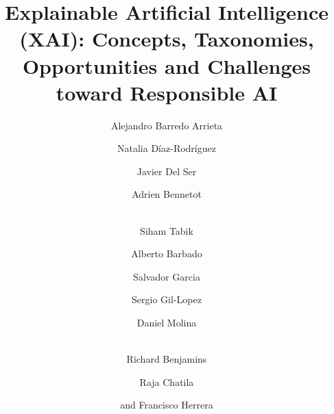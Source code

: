 \documentclass[final]{elsarticle}
\begin{document}
\begin{frontmatter}
	
\title{Explainable Artificial Intelligence (XAI): Concepts, Taxonomies, Opportunities and Challenges toward Responsible AI}

\author[a]{Alejandro Barredo Arrieta}
\author[g]{Natalia D\'iaz-Rodr\'iguez}
\author[a,c,d]{Javier Del Ser}
\author[g,h,i]{Adrien Bennetot}
\author[f]{\\Siham Tabik}
\author[j]{Alberto Barbado}
\author[f]{Salvador Garcia}
\author[a]{Sergio Gil-Lopez}
\author[f]{Daniel Molina}
\author[j]{\\Richard Benjamins}
\author[i]{Raja Chatila}
\author[f]{and Francisco Herrera}

\address[a]{TECNALIA, 48160 Derio, Spain}
\address[g]{ENSTA, Institute Polytechnique Paris and INRIA Flowers Team, Palaiseau, France}
\address[c]{University of the Basque Country (UPV/EHU), 48013 Bilbao, Spain}
\address[d]{Basque Center for Applied Mathematics (BCAM), 48009 Bilbao, Bizkaia, Spain}
\address[h]{Segula Technologies, Parc d'activit\'e de Pissaloup, Trappes, France}
\address[i]{Institut des Syst\`emes Intelligents et de Robotique, Sorbonne Universit\`e, France}
\address[f]{DaSCI Andalusian Institute of Data Science and Computational Intelligence, University of Granada, 18071 Granada, Spain}
\address[j]{Telefonica, 28050 Madrid, Spain}


\end{frontmatter}
\end{document}
